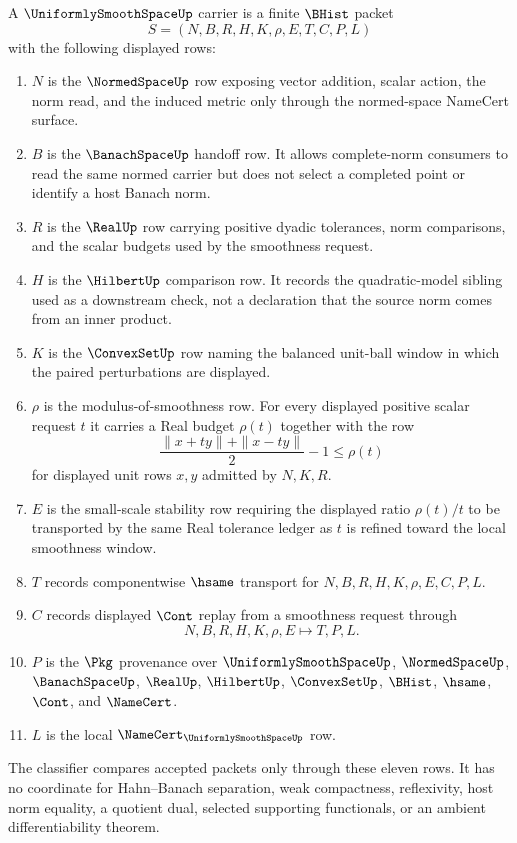 \begin{definition}
\label{def:uniformly-smooth-space-carrier}
A $\UniformlySmoothSpaceUp$ carrier is a finite $\BHist$ packet
$$
S=(N,B,R,H,K,\rho,E,T,C,P,L)
$$
with the following displayed rows:
\begin{enumerate}
\item $N$ is the $\NormedSpaceUp$ row exposing vector addition, scalar action, the norm read, and the induced metric only through the normed-space NameCert surface.
\item $B$ is the $\BanachSpaceUp$ handoff row. It allows complete-norm consumers to read the same normed carrier but does not select a completed point or identify a host Banach norm.
\item $R$ is the $\RealUp$ row carrying positive dyadic tolerances, norm comparisons, and the scalar budgets used by the smoothness request.
\item $H$ is the $\HilbertUp$ comparison row. It records the quadratic-model sibling used as a downstream check, not a declaration that the source norm comes from an inner product.
\item $K$ is the $\ConvexSetUp$ row naming the balanced unit-ball window in which the paired perturbations are displayed.
\item $\rho$ is the modulus-of-smoothness row. For every displayed positive scalar request $t$ it carries a Real budget $\rho(t)$ together with the row
$$
\frac{\|x+t y\|+\|x-t y\|}{2}-1 \leq \rho(t)
$$
for displayed unit rows $x,y$ admitted by $N,K,R$.
\item $E$ is the small-scale stability row requiring the displayed ratio $\rho(t)/t$ to be transported by the same Real tolerance ledger as $t$ is refined toward the local smoothness window.
\item $T$ records componentwise $\hsame$ transport for $N,B,R,H,K,\rho,E,C,P,L$.
\item $C$ records displayed $\Cont$ replay from a smoothness request through
$$
N,B,R,H,K,\rho,E \longmapsto T,P,L .
$$
\item $P$ is the $\Pkg$ provenance over $\UniformlySmoothSpaceUp$, $\NormedSpaceUp$, $\BanachSpaceUp$, $\RealUp$, $\HilbertUp$, $\ConvexSetUp$, $\BHist$, $\hsame$, $\Cont$, and $\NameCert$.
\item $L$ is the local $\NameCert_{\UniformlySmoothSpaceUp}$ row.
\end{enumerate}
The classifier compares accepted packets only through these eleven rows. It has no coordinate for Hahn--Banach separation, weak compactness, reflexivity, host norm equality, a quotient dual, selected supporting functionals, or an ambient differentiability theorem.
\end{definition}

